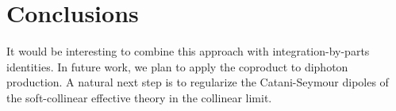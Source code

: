 \section{Conclusions}\label{sec:conclusions}

It would be interesting to combine this approach with
integration-by-parts identities. In future work, we plan to apply the
coproduct to diphoton production. A natural next step is to regularize
the Catani-Seymour dipoles of the soft-collinear effective theory in the
collinear limit.

